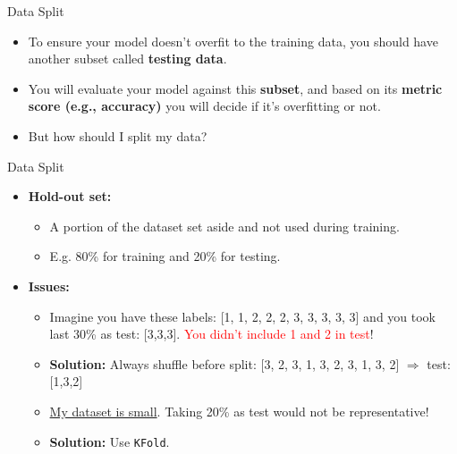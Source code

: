\begin{frame}{Data Split}
\begin{itemize}
    \item To ensure your model doesn’t overfit to the training data, you should have another subset called \textbf{testing data}.
    \item You will evaluate your model against this \textbf{subset}, and based on its \textbf{metric score (e.g., accuracy)} you will decide if it’s overfitting or not.
    \item But how should I split my data?
\end{itemize}
\end{frame}


\begin{frame}{Data Split}
\begin{itemize}
    \item \textbf{Hold-out set:}
    \begin{itemize}
        \item A portion of the dataset set aside and not used during training.
        \item E.g. 80\% for training and 20\% for testing.
    \end{itemize}

    \item \textbf{Issues:}
    \begin{itemize}
        \item Imagine you have these labels: [1, 1, 2, 2, 2, 3, 3, 3, 3, 3] and you took last 30\% as test: [3,3,3]. \textcolor{red}{You didn’t include 1 and 2 in test}!
        \item \textbf{Solution:} Always shuffle before split: [3, 2, 3, 1, 3, 2, 3, 1, 3, 2] $\Rightarrow$ test: [1,3,2]
        \item \underline{My dataset is small}. Taking 20\% as test would not be representative!
        \item \textbf{Solution:} Use \texttt{KFold}.
    \end{itemize}
\end{itemize}
\end{frame}

